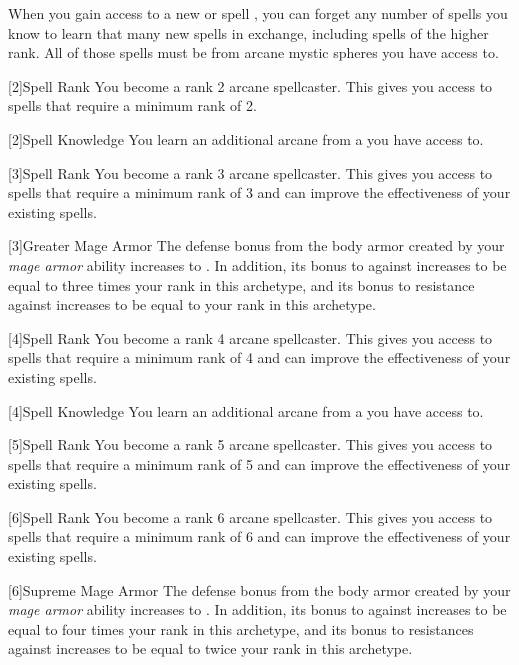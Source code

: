         When you gain access to a new  or spell ,
            you can forget any number of spells you know to learn that many new spells in exchange,
            including spells of the higher rank.
        All of those spells must be from arcane mystic spheres you have access to.

        [2]{Spell Rank} You become a rank 2 arcane spellcaster.
        This gives you access to spells that require a minimum rank of 2.

        [2]{Spell Knowledge} You learn an additional arcane  from a  you have access to.

        [3]{Spell Rank} You become a rank 3 arcane spellcaster.
        This gives you access to spells that require a minimum rank of 3 and can improve the effectiveness of your existing spells.

        [3]{Greater Mage Armor}
        The defense bonus from the body armor created by your \textit{mage armor} ability increases to .
        In addition, its bonus to  against  increases to be equal to three times your rank in this archetype, and its bonus to resistance against  increases to be equal to your rank in this archetype.

        [4]{Spell Rank} You become a rank 4 arcane spellcaster.
        This gives you access to spells that require a minimum rank of 4 and can improve the effectiveness of your existing spells.

        [4]{Spell Knowledge} You learn an additional arcane  from a  you have access to.

        [5]{Spell Rank} You become a rank 5 arcane spellcaster.
        This gives you access to spells that require a minimum rank of 5 and can improve the effectiveness of your existing spells.

        [6]{Spell Rank} You become a rank 6 arcane spellcaster.
        This gives you access to spells that require a minimum rank of 6 and can improve the effectiveness of your existing spells.

        [6]{Supreme Mage Armor}
        The defense bonus from the body armor created by your \textit{mage armor} ability increases to .
        In addition, its bonus to  against  increases to be equal to four times your rank in this archetype, and its bonus to resistances against  increases to be equal to twice your rank in this archetype.

